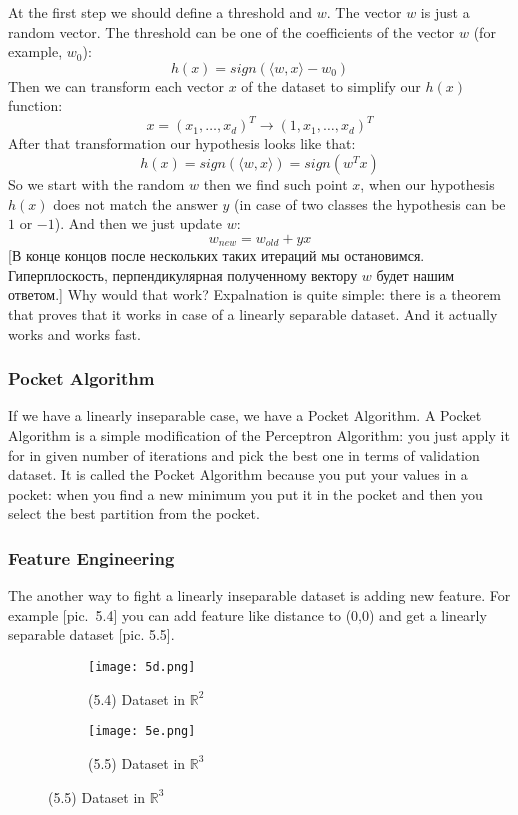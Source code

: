 At the first step we should define a threshold and $w$. The vector $w$ is just a random vector. The threshold can be one of the coefficients of the vector $w$ (for example, $w_0$):
$$h(x)=sign\left(\langle w,x\rangle-w_0\right)$$
Then we can transform each vector $x$ of the dataset to simplify our $h(x)$ function: $$x=(x_1,\ldots,x_d)^T\to(1, x_1, \ldots, x_d)^T$$ After that transformation our hypothesis looks like that:
$$h(x)=sign\left(\langle w, x\rangle\right)=sign(w^Tx)$$
So we start with the random $w$ then we find such point $x$, when our hypothesis $h(x)$ does not match the answer $y$ (in case of two classes the hypothesis can be $1$ or $-1$). And then we just update $w$:
$$w_{new}=w_{old}+yx$$
[В конце концов после нескольких таких итераций мы остановимся. Гиперплоскость, перпендикулярная полученному вектору $w$ будет нашим ответом.]
Why would that work? Expalnation is quite simple: there is a theorem  that proves that it works in case of a linearly separable dataset. {\it <Some intuition about proof of this theorem>} And it actually works and works fast.

\subsubsection*{Pocket Algorithm}

If we have a linearly inseparable case, we have a Pocket Algorithm. {\it <An example with handwritten digits dataset>} A Pocket Algorithm is a simple modification of the Perceptron Algorithm: you just apply it for in given number of iterations and pick the best one in terms of validation dataset. It is called the Pocket Algorithm because you put your values in a pocket: when you find a new minimum you put it in the pocket and then you select the best partition from the pocket.


\hypertarget{new_features}{}
\subsubsection*{Feature Engineering}

The another way to fight a linearly inseparable dataset is adding new feature. For example [pic.~5.4] you can add feature like distance to (0,0) and get a linearly separable dataset [pic. 5.5].
\begin{figure}[h!]
  \centering
  \begin{subfigure}[l]{0.353\linewidth}
    \texttt{[image: 5d.png]}
    \caption*{(5.4) Dataset in $\mathbb{R}^2$}
  \end{subfigure}
  \hspace{2cm}
  \begin{subfigure}[r]{0.4\linewidth}
    \texttt{[image: 5e.png]}
    \caption*{(5.5) Dataset in $\mathbb{R}^3$}
  \end{subfigure}
\end{figure}

